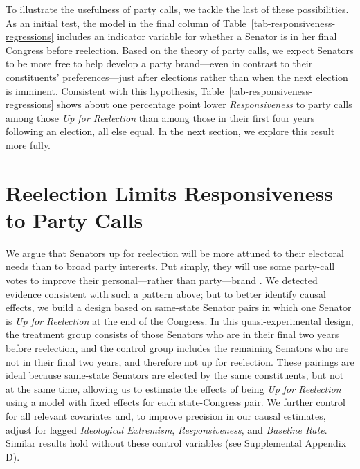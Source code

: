 \documentclass[12pt]{article}
\begin{document}
To illustrate the usefulness of party calls, we tackle the last of these
possibilities.
As an initial test, the model in the final column of
Table~\ref{tab-responsiveness-regressions} includes an indicator variable for
whether a Senator is in her final Congress before reelection.
Based on the theory of party calls, we expect Senators to be more free to help
develop a party brand---even in contrast to their constituents'
preferences---just after elections rather than when the next election is
imminent.
Consistent with this hypothesis, Table~\ref{tab-responsiveness-regressions}
shows about one percentage point lower \textit{Responsiveness} to party calls
among those \textit{Up for Reelection} than among those in their first four
years following an election, all else equal.
In the next section, we explore this result more fully.


\section*{Reelection Limits Responsiveness to Party Calls}


We argue that Senators up for reelection will be more attuned to their electoral
needs than to broad party interests.
Put simply, they will use some party-call votes to improve their
personal---rather than party---brand \citep[e.g.,][]{Canes-Wrone:2002,
Carson:2010}.
We detected evidence consistent with such a pattern above; but to better
identify causal effects, we build a design based on same-state Senator pairs in
which one Senator is \textit{Up for Reelection} at the end of the Congress.
In this quasi-experimental design, the treatment group consists of those
Senators who are in their final two years before reelection, and the control
group includes the remaining Senators who are not in their final two years,
and therefore not up for reelection.
These pairings are ideal because same-state Senators are elected by the same
constituents, but not at the same time, allowing us to estimate the effects of
being \textit{Up for Reelection} using a model with fixed effects for each
state-Congress pair.
We further control for all relevant covariates and, to improve precision in our
causal estimates, adjust for lagged \textit{Ideological Extremism},
\textit{Responsiveness}, and \textit{Baseline Rate}.
Similar results hold without these control variables (see Supplemental Appendix
D).
\end{document}
